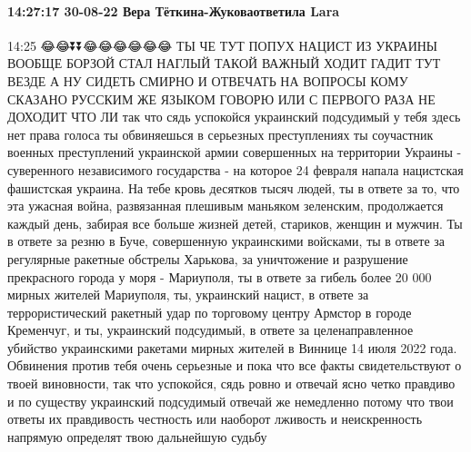  
 
 
 
 

\paragraph{14:27:17 30-08-22 Вера Тёткина-Жуковаответила Lara}
14:25
😂😂⏬⏬😂😂😂😂😂😂
ТЫ ЧЕ ТУТ ПОПУХ НАЦИСТ ИЗ УКРАИНЫ ВООБЩЕ БОРЗОЙ СТАЛ НАГЛЫЙ
ТАКОЙ ВАЖНЫЙ ХОДИТ ГАДИТ ТУТ ВЕЗДЕ А НУ СИДЕТЬ СМИРНО И
ОТВЕЧАТЬ НА ВОПРОСЫ КОМУ СКАЗАНО РУССКИМ ЖЕ ЯЗЫКОМ ГОВОРЮ
ИЛИ С ПЕРВОГО РАЗА НЕ ДОХОДИТ ЧТО ЛИ так что сядь успокойся украинский
подсудимый у тебя здесь нет права голоса ты обвиняешься в серьезных преступлениях ты
соучастник военных преступлений украинской армии совершенных на территории Украины
- суверенного независимого государства - на которое 24 февраля напала нацистская
фашистская украина. На тебе кровь десятков тысяч людей, ты в ответе за то, что эта
ужасная война, развязанная плешивым маньяком зеленским, продолжается каждый день,
забирая все больше жизней детей, стариков, женщин и мужчин. Ты в ответе за резню в
Буче, совершенную украинскими войсками, ты в ответе за регулярные ракетные обстрелы
Харькова, за уничтожение и разрушение прекрасного города у моря - Мариуполя, ты в
ответе за гибель более 20 000 мирных жителей Мариуполя, ты, украинский нацист, в ответе за
террористический ракетный удар по торговому центру Армстор в городе Кременчуг, и
ты, украинский подсудимый, в ответе за целенаправленное убийство украинскими
ракетами мирных жителей в Виннице 14 июля 2022 года. Обвинения против тебя
очень серьезные и пока что все факты свидетельствуют о твоей виновности, так
что успокойся, сядь ровно и отвечай ясно четко правдиво и по существу украинский
подсудимый отвечай же немедленно потому что твои ответы их правдивость честность
или наоборот лживость и неискренность напрямую определят твою дальнейшую
судьбу
